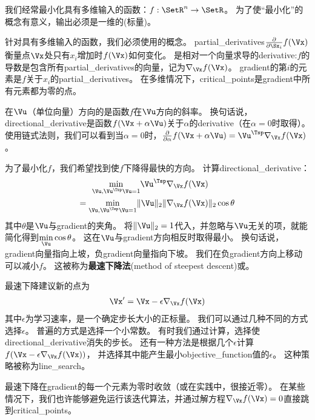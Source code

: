 我们经常最小化具有多维输入的函数：$f: \SetR^n \rightarrow \SetR $。 
为了使``最小化''的概念有意义，输出必须是一维的(标量)。


针对具有多维输入的函数，我们必须使用的概念。
\gls{partial_derivatives}$\frac{\partial}{\partial \Sx_i}f(\Vx)$衡量点$\Vx$处只有$x_i$增加时$f(\Vx)$如何变化。
是相对一个向量求导的\gls{derivative}:$f$的导数是包含所有\gls{partial_derivatives}的向量，记为$\nabla_{\Vx} f(\Vx)$。
\gls{gradient}的第$i$的元素是$f$关于$x_i$的\gls{partial_derivatives}。
在多维情况下，\gls{critical_points}是\gls{gradient}中所有元素都为零的点。

在$\Vu$（单位向量）方向的是函数$f$在$\Vu$方向的斜率。
换句话说，\gls{directional_derivative}是函数$f(\Vx + \alpha \Vu)$关于$\alpha$的\gls{derivative}（在$\alpha = 0$时取得）。
使用链式法则，我们可以看到当$\alpha=0$时，$\frac{\partial}{\partial \alpha} f(\Vx + \alpha \Vu) = \Vu^\Tsp \nabla_{\Vx} f(\Vx)$。

为了最小化$f$，我们希望找到使$f$下降得最快的方向。
计算\gls{directional_derivative}：
\begin{align}
 \underset{\Vu, \Vu^\Tsp\Vu = 1}{\min} \Vu^\Tsp & \nabla_{\Vx} f(\Vx) \\
 = \underset{\Vu, \Vu^\Tsp\Vu = 1}{\min} \| \Vu \|_2 \| &\nabla_{\Vx}f(\Vx) \|_2 \cos \theta
\end{align}
其中$\theta$是$\Vu$与\gls{gradient}的夹角。
将$ \| \Vu \|_2 = 1$代入，并忽略与$\Vu$无关的项，就能简化得到$ \underset{\Vu}{\min} \cos \theta $。 
这在$\Vu$与\gls{gradient}方向相反时取得最小。
换句话说，\gls{gradient}向量指向上坡，负\gls{gradient}向量指向下坡。
我们在负\gls{gradient}方向上移动可以减小$f$。
这被称为\textbf{最速下降法}(method of steepest descent)或。

最速下降建议新的点为
\begin{align}
  \Vx' = \Vx - \epsilon \nabla_{\Vx} f(\Vx)
\end{align}
其中$\epsilon$为学习速率，是一个确定步长大小的正标量。
我们可以通过几种不同的方式选择$\epsilon$。
普遍的方式是选择一个小常数。
有时我们通过计算，选择使\gls{directional_derivative}消失的步长。
还有一种方法是根据几个$\epsilon$计算$f(\Vx - \epsilon \nabla_{\Vx} f(\Vx))$， 并选择其中能产生最小\gls{objective_function}值的$\epsilon$。
这种策略被称为\gls{line_search}。

最速下降在\gls{gradient}的每一个元素为零时收敛（或在实践中，很接近零）。
在某些情况下，我们也许能够避免运行该迭代算法，并通过解方程$\nabla_{\Vx} f(\Vx)= 0$直接跳到\gls{critical_points}。

